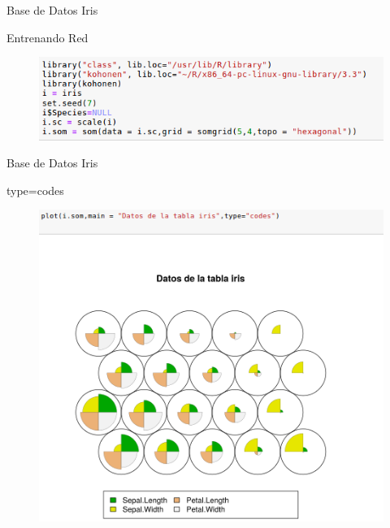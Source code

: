 \documentclass{beamer}
\begin{document}
\begin{frame}{Base de Datos Iris}
\begin{block}{Entrenando Red}
\begin{figure}
\includegraphics[scale=0.4]{mallairis.png}
\centering
\end{figure}
\end{block}
\end{frame}

\begin{frame}{Base de Datos Iris}
\begin{block}{type=codes}
\begin{figure}
\includegraphics[scale=0.4]{codes.png}
\centering
\end{figure}
\end{block}
\end{frame}
\end{document}
